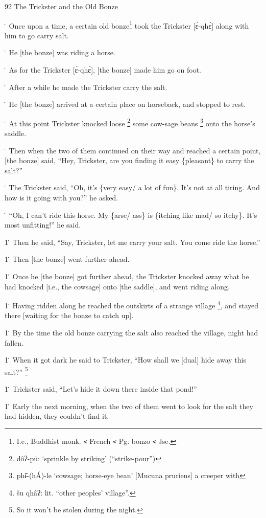 
92 The Trickster and the Old Bonze

\. Once upon a time, a certain old bonze\footnote{I.e., Buddhist monk. \texttt{<} French \texttt{<} Pg. bonzo \texttt{<} Jse.} took the Trickster [ɛ̀-qhɛ̀] along
with him to go carry salt.

\. He [the bonze] was riding a horse.

\. As for the Trickster [ɛ̀-qhɛ̀], [the bonze] made him go on foot.

\. After a while he made the Trickster carry the salt.

\. He [the bonze] arrived at a certain place on horseback, and stopped to rest.

\. At this point Trickster knocked loose \footnote{dôʔ-pū: `sprinkle by striking' (``strike-pour'')} some cow-sage beans \footnote{phɨ̂-(hÁ)-le `cowsage; horse-eye bean' [Mucuna pruriens] a creeper with} onto the horse's
saddle.

\. Then when the two of them continued on their way and reached a certain point,
[the bonze] said, ``Hey, Trickster, are you finding it easy \{pleasant\} to carry
the salt?''

\. The Trickster said, ``Oh, it's \{very easy/ a lot of fun\}. It's not at all
tiring. And how is it going with you?'' he asked.

\. ``Oh, I can't ride this horse. My \{arse/ ass\} is \{itching like mad/ so itchy\}.
It's most unfitting!'' he said.

1\. Then he said, ``Say, Trickster, let me carry your salt. You come ride the horse.''

1\. Then [the bonze] went further ahead.

1\. Once he [the bonze] got further ahead, the Trickster knocked away what he had
knocked [i.e., the cowsage] onto [the saddle], and went riding along.

1\. Having ridden along he reached the outskirts of a strange village \footnote{šu qhâʔ: lit. ``other peoples' village''.}, and
stayed there [waiting for the bonze to catch up].

1\. By the time the old bonze carrying the salt also reached the village, night
had fallen.

1\. When it got dark he said to Trickster, ``How shall we [dual] hide away this
salt?'' \footnote{So it won't be stolen during the night.}

1\. Trickster said, ``Let's hide it down there inside that pond!''

1\. Early the next morning, when the two of them went to look for the salt they
had hidden, they couldn't find it.


